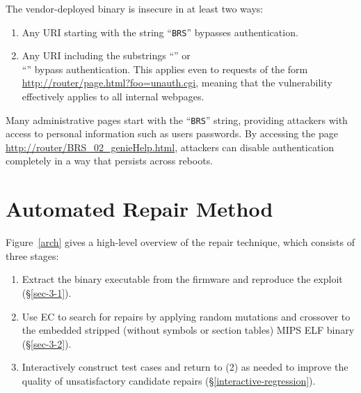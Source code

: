 \documentclass{sig-alternate}
\begin{document}
The vendor-deployed binary is insecure in at least two ways:
\begin{enumerate}
\item Any URI starting with the string ``{\tt BRS}'' bypasses authentication.

\item Any URI including the substrings ``'' or\\
  ``'' bypass authentication. This applies
  even to requests of the form
  \url{http://router/page.html?foo=unauth.cgi}, meaning that the
  vulnerability effectively applies to all internal webpages.
\end{enumerate}

\noindent Many administrative pages start with the ``{\tt BRS}'' string, providing
attackers with access to personal information such as users
passwords.  By accessing the page
\url{http://router/BRS_02_genieHelp.html}, attackers can
disable authentication completely in a way that persists
across reboots.

\section{Automated Repair Method}
\label{sec-3}

Figure~\ref{arch} gives a high-level overview of the repair technique, which consists of three stages:
\begin{enumerate}
\item Extract the binary executable from the firmware and reproduce
the exploit (\S\ref{sec-3-1}).
\item Use EC to search for repairs by applying random mutations and
  crossover to the embedded stripped (without symbols or section
  tables) MIPS ELF binary (\S\ref{sec-3-2}).
\item Interactively construct test cases and return to (2) as needed
  to improve the quality of unsatisfactory candidate repairs
  (\S\ref{interactive-regression}).
\end{enumerate}

\begin{figure*}
  \centering
  \caption{\label{arch}Three-stage automated evolutionary repair
    technique: (1) the vulnerable binary is extracted from the
    vendor-supplied firmware; (2) EC techniques are used to find
    versions of the binary which resolve the target vulnerabilities;
    (3) the user interactively adds test cases protecting broken
    functionality and returns to step 2 until an acceptable repair is found.}
\end{figure*}
\end{document}
